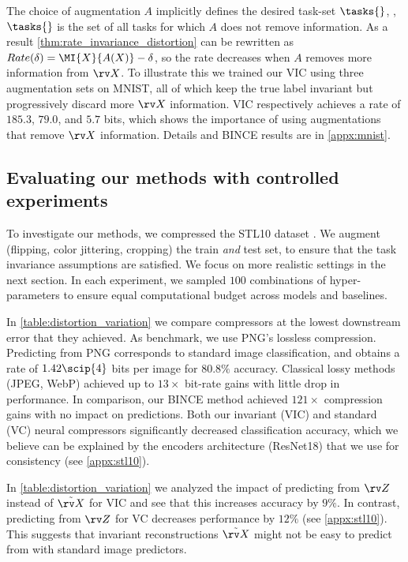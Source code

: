 \documentclass[final]{article}
\begin{document}
The choice of augmentation $A$ implicitly defines the desired task-set $\tasks{}$, \ie, $\tasks{}$ is the set of all tasks for which $A$ does not remove information.
As a result \cref{thm:rate_invariance_distortion} can be rewritten as $Rate(\delta) = \MI{X}{A(X)} - \delta$, so the rate decreases when $A$ removes more information from $\rv X$.
To illustrate this we trained our VIC using three augmentation sets on MNIST, all of which keep the true label invariant but progressively discard more $\rv X$ information.
VIC respectively achieves a rate of $185.3$, $79.0$, and $5.7$ bits, which shows the importance of using augmentations that remove $\rv X$ information.
Details and BINCE results are in \cref{appx:mnist}.




\subsection{Evaluating our methods with controlled experiments}
To investigate our methods, we compressed the STL10 dataset \cite{coates_analysis_2011}.
We augment (flipping, color jittering, cropping) the train \textit{and} test set, to ensure that the task invariance assumptions are satisfied.
We focus on more realistic settings in the next section.
In each experiment, we sampled $100$ combinations of hyper-parameters to ensure equal computational budget across models and baselines.






In \cref{table:distortion_variation} we compare compressors at the lowest downstream error that they achieved.
As benchmark, we use PNG's lossless compression.
Predicting from PNG corresponds to standard image classification, and obtains a rate of $1.42\scip{4}$ bits per image for $80.8 \%$ accuracy.
Classical lossy methods (JPEG, WebP) achieved up to $13 \times$ bit-rate gains with little drop in performance.
In comparison, our BINCE method achieved $121 \times$  compression gains with no impact on predictions.
Both our invariant (VIC) and standard (VC) neural compressors significantly decreased classification accuracy, which we believe can be explained by the encoders architecture (ResNet18) that we use for consistency (see \cref{appx:stl10}).


In \cref{table:distortion_variation} we analyzed the impact of predicting from $\rv Z$ instead of $\Tilde{\rv X}$ for VIC and see that this increases accuracy by $9\%$. 
In contrast, predicting from $\rv Z$ for VC decreases performance by $12\%$ (see \cref{appx:stl10}).
This suggests that invariant reconstructions $\Tilde{\rv X}$ might not be easy to predict from with standard image predictors.
\end{document}
